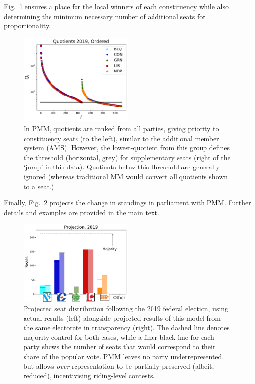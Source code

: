 Fig.~\ref{fig:sum_Qlist_ordered_2019} ensures a place for the local winners of each constituency while also determining the minimum necessary number of additional seats for proportionality.
\begin{figure}
\includegraphics[width=0.50\textwidth,clip]{PR_calcs/data/raw_2019/PMM_out/PMM_Qlist_all.pdf}
\caption{ In PMM, quotients are ranked from all parties, giving priority to constituency seats (to the left), similar to the additional member system (AMS). However, the lowest-quotient from this group defines the threshold (horizontal, grey) for supplementary seats (right of the `jump' in this data). Quotients below this threshold are generally ignored (whereas traditional MM would convert all quotients shown to a seat.)}
\label{fig:sum_Qlist_ordered_2019}
\end{figure}
Finally, Fig.~\ref{fig:sum_projection_2019} projects the change in standings in parliament with PMM. Further details and examples are provided in the main text.

\begin{figure}
  \includegraphics[width=0.50\textwidth,clip]{PR_calcs/data/raw_2019/PMM_out/PMM_projections.pdf}
  \caption{Projected seat distribution following the 2019 federal election, using actual results (left) alongside projected results of this model from the same electorate in transparency (right). The dashed line denotes majority control for both cases, while a finer black line for each party shows the number of seats that would correspond to their share of the popular vote. PMM leaves no party underrepresented, but allows \emph{over}-representation to be partially preserved (albeit, reduced), incentivising riding-level contests.}
\label{fig:sum_projection_2019}
\end{figure}
